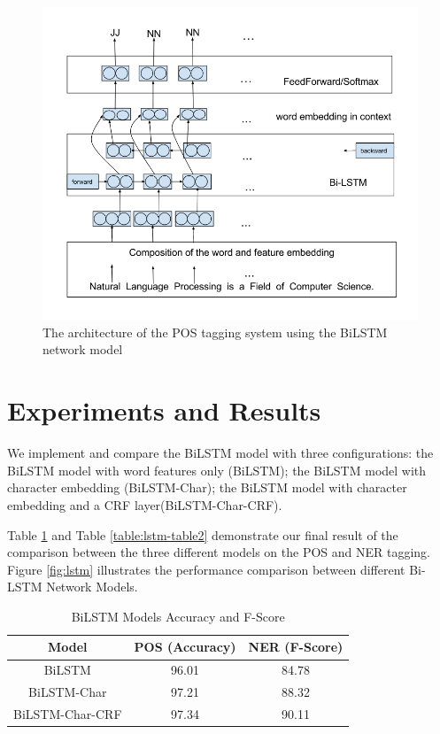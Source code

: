 \documentclass{sfuthesis}
\begin{document}
\begin{figure}
  \centering
  \includegraphics[scale=0.6]{bilstm.png}
 \caption{The architecture of the POS tagging system using the BiLSTM network model}
  \label{fig:bilstm}
\end{figure}

 
\section{Experiments and Results}

We implement and compare the BiLSTM model with three configurations: the BiLSTM model with word features only (BiLSTM); the BiLSTM model with character embedding (BiLSTM-Char); the BiLSTM model with character embedding and a CRF layer(BiLSTM-Char-CRF).

Table \ref{table:lstm-table1} and Table \ref{table:lstm-table2} demonstrate our final result of the comparison between the three different models on the POS and NER tagging. Figure \ref{fig:lstm} illustrates the performance comparison between different Bi-LSTM Network Models.

\begin{table}[]
\centering
\caption{BiLSTM Models Accuracy and F-Score}
\label{table:lstm-table1}
\begin{tabular}{|c|c|c|}
\hline
Model         & POS (Accuracy)  & NER (F-Score)       \\ \hline
BiLSTM  & 96.01     & 84.78                             \\ \hline
BiLSTM-Char & 97.21 & 88.32             \\ \hline
BiLSTM-Char-CRF & 97.34  & 90.11             \\ \hline
\end{tabular}
\end{table}
\end{document}
